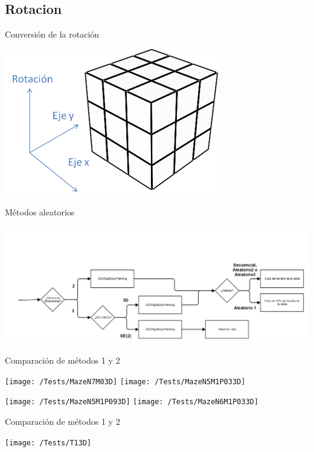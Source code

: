 \documentclass[10pt]{beamer}
\begin{document}
\subsection{Rotacion}
\begin{frame}{Conversión de la rotación}
	\begin{center}
	\includegraphics[width=0.7\textwidth,height=0.6\textheight,keepaspectratio]{rotacion}	
	\end{center}
\end{frame}


\begin{frame}{Métodos aleatorios}
\begin{center}
\includegraphics[width=\textwidth,height=0.8\textheight,keepaspectratio]{seleccion}	
\end{center}
\end{frame}

\begin{frame}{Comparación de métodos 1 y 2}
\begin{center}
\texttt{[image: /Tests/MazeN7M03D]}
\texttt{[image: /Tests/MazeN5M1P033D]}

\texttt{[image: /Tests/MazeN5M1P093D]}
\texttt{[image: /Tests/MazeN6M1P033D]}
\end{center}
\end{frame}

\begin{frame}{Comparación de métodos 1 y 2}
\vfill
\begin{center}
\texttt{[image: /Tests/T13D]}
\end{center}
\end{frame}
\end{document}
